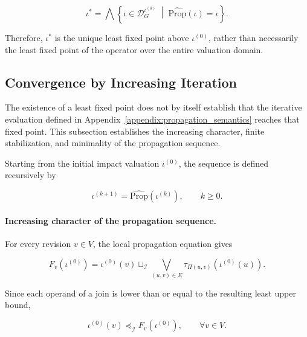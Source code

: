 \documentclass[10pt]{article}
\begin{document}
\begin{equation}
	\iota^{*}
	=
	\bigwedge
	\left\{
	\iota
	\in
	\mathcal D_G^{\iota^{(0)}}
	\;\middle|\;
	\widehat{\mathrm{Prop}}(\iota)
	=
	\iota
	\right\}.
	\label{eq:least_fixed_point_characterization}
\end{equation}

Therefore, $\iota^{*}$ is the unique least fixed point above
$\iota^{(0)}$, rather than necessarily the least fixed point of the operator
over the entire valuation domain.

\subsection{Convergence by Increasing Iteration}

The existence of a least fixed point does not by itself establish that the
iterative evaluation defined in Appendix~\ref{appendix:propagation_semantics}
reaches that fixed point. This subsection establishes the increasing character,
finite stabilization, and minimality of the propagation sequence.

Starting from the initial impact valuation $\iota^{(0)}$, the sequence is
defined recursively by

\begin{equation}
	\iota^{(k+1)}
	=
	\widehat{\mathrm{Prop}}
	\!\left(
	\iota^{(k)}
	\right),
	\qquad
	k\geq 0.
	\label{eq:kleene_iteration}
\end{equation}

\paragraph{Increasing character of the propagation sequence.}

For every revision $v\in V$, the local propagation equation gives

\begin{equation}
	F_v\!\left(\iota^{(0)}\right)
	=
	\iota^{(0)}(v)
	\sqcup_{\mathcal I}
	\bigvee_{(u,v)\in E}
	\tau_{\Pi(u,v)}
	\!\left(
	\iota^{(0)}(u)
	\right).
	\label{eq:initial_local_expansion}
\end{equation}

Since each operand of a join is lower than or equal to the resulting least
upper bound,

\begin{equation}
	\iota^{(0)}(v)
	\preceq_{\mathcal I}
	F_v\!\left(\iota^{(0)}\right),
	\qquad
	\forall v\in V.
	\label{eq:initial_component_growth}
\end{equation}
\end{document}
